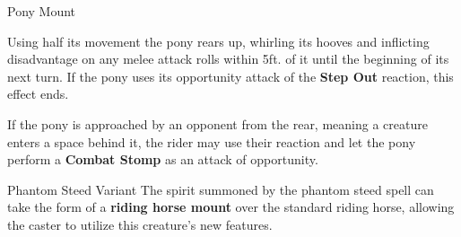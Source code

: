 \documentclass[letterpaper,twocolumn,openany,nodeprecatedcode]{dndbook}
\begin{document}
\begin{DndMonster}[float*=b,width=\textwidth + 8pt]{Pony Mount}
\begin{multicols}{2}
    Using half its movement the pony rears up, whirling its hooves and inflicting disadvantage on any melee attack rolls within 5ft. of it until the beginning of its next turn. If the pony uses its opportunity attack of the \textbf{Step Out} reaction, this effect ends.


    If the pony is approached by an opponent from the rear, meaning a creature enters a space behind it, the rider may use their reaction and let the pony perform a \textbf{Combat Stomp} as an attack of opportunity.

  \end{multicols}
\end{DndMonster}

\begin{DndComment}{Phantom Steed Variant}
    The spirit summoned by the phantom steed spell can take the form of a \textbf{riding horse mount} over the standard riding horse, allowing the caster to utilize this creature’s new features.
\end{DndComment}
\end{document}
